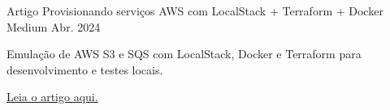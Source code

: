 
\begin{cventries}

  \cventry
    {Artigo} %
    {Provisionando serviços AWS com LocalStack + Terraform + Docker} %
    {Medium} %
    {Abr. 2024} %
    {
      \begin{cvitems} %
        \item {Emulação de AWS S3 e SQS com LocalStack, Docker e Terraform para desenvolvimento e testes locais.}
        \item {\href{https://medium.com/@carlos.campos81/provisionando-serviços-aws-com-localstack-terraform-docker-1a5342cdcb59}{Leia o artigo aqui.}}
      \end{cvitems}
    }


\end{cventries}
